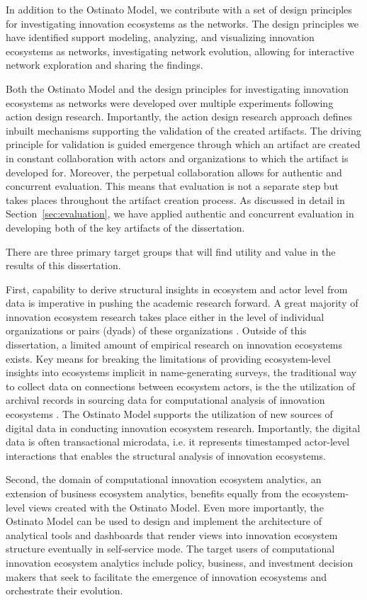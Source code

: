 In addition to the Ostinato Model, we contribute with a set of design principles for investigating innovation ecosystems as the networks. The design principles we have identified support modeling, analyzing, and visualizing innovation ecosystems as networks, investigating network evolution, allowing for interactive network exploration and sharing the findings. 

Both the Ostinato Model and the design principles for investigating innovation ecosystems as networks were developed over multiple experiments following action design research. Importantly, the action design research approach defines inbuilt mechanisms supporting the validation of the created artifacts. The driving principle for validation is guided emergence through which an artifact are created in constant collaboration with actors and organizations to which the artifact is developed for. Moreover, the perpetual collaboration allows for authentic and concurrent evaluation. This means that evaluation is not a separate step but takes places throughout the artifact creation process. As discussed in detail in Section~\ref{sec:evaluation}, we have applied authentic and concurrent evaluation in developing both of the key artifacts of the dissertation.

There are three primary target groups that will find utility and value in the results of this dissertation.

First, capability to derive structural insights in ecosystem and actor level from data is imperative in pushing the academic research forward. A great majority of innovation ecosystem research takes place either in the level of individual organizations or pairs (dyads) of these organizations \citep{Jarvi2016TakingReview}. Outside of this dissertation, a limited amount of empirical research on innovation ecosystems exists. Key means for breaking the limitations of providing ecosystem-level insights into ecosystems implicit in name-generating surveys, the traditional way to collect data on connections between ecosystem actors, is the the utilization of archival records in sourcing data for computational analysis of innovation ecosystems \citep[cf.][]{Williams2015MixedAnalysis}. The Ostinato Model supports the utilization of new sources of digital data in conducting innovation ecosystem research. Importantly, the digital data is often transactional microdata, i.e. it represents timestamped actor-level interactions that enables the structural analysis of innovation ecosystems.

Second, the domain of computational innovation ecosystem analytics, an extension of business ecosystem analytics, benefits equally from the ecosystem-level views created with the Ostinato Model. Even more importantly, the Ostinato Model can be used to design and implement the architecture of analytical tools and dashboards that render views into innovation ecosystem structure eventually in self-service mode. The target users of computational innovation ecosystem analytics include policy, business, and investment decision makers that seek to facilitate the emergence of innovation ecosystems and orchestrate their evolution. 

